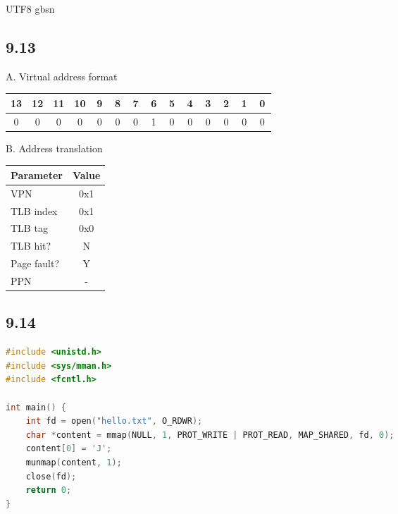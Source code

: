 \documentclass {article}
\begin{document}
\begin {CJK*} {UTF8} {gbsn}
			\subsection{9.13}
				A. Virtual address format
				\begin{table}[!htbp]
					\begin{tabular}{cccccccccccccc}
						13                      & 12                     & 11                     & 10                     & 9                      & 8                      & 7                      & 6                      & 5                      & 4                      & 3                      & 2                      & 1                      & 0                      \\ \hline
						\multicolumn{1}{|c|}{\,0\,} & \multicolumn{1}{c|}{\,0\,} & \multicolumn{1}{c|}{\,0\,} & \multicolumn{1}{c|}{\,0\,} & \multicolumn{1}{c|}{\,0\,} & \multicolumn{1}{c|}{\,0\,} & \multicolumn{1}{c|}{\,0\,} & \multicolumn{1}{c|}{\,1\,} & \multicolumn{1}{c|}{\,0\,} & \multicolumn{1}{c|}{\,0\,} & \multicolumn{1}{c|}{\,0\,} & \multicolumn{1}{c|}{\,0\,} & \multicolumn{1}{c|}{\,0\,} & \multicolumn{1}{c|}{\,0\,} \\ \hline
					\end{tabular}
				\end{table}

				B. Address translation
				\begin{table}[!htbp]
					\begin{tabular}{lc}
						Parameter   & Value \\ \hline
						VPN         & 0x1   \\
						TLB index   & 0x1   \\
						TLB tag     & 0x0   \\
						TLB hit?    & N     \\
						Page fault? & Y     \\
						PPN         & - 
					\end{tabular}
				\end{table}

			\subsection{9.14}
				\begin{lstlisting}[language=C]
#include <unistd.h>
#include <sys/mman.h>
#include <fcntl.h>

int main() {
	int fd = open("hello.txt", O_RDWR);
	char *content = mmap(NULL, 1, PROT_WRITE | PROT_READ, MAP_SHARED, fd, 0);
	content[0] = 'J';
	munmap(content, 1);
	close(fd);
	return 0;
}
				\end{lstlisting}

  \end {CJK*}
\end{document}
